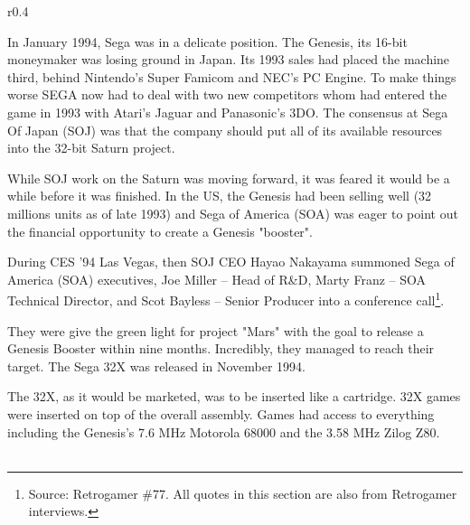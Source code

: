 \begin{wrapfigure}[4]{r}{0.4\textwidth}{
\centering {}}
\end{wrapfigure}
In January 1994, Sega was in a delicate position. The Genesis, its 16-bit moneymaker was losing ground in Japan. Its 1993 sales had placed the machine third, behind Nintendo's Super Famicom and NEC's PC Engine. To make things worse SEGA now had to deal with two new competitors whom had entered the game in 1993 with Atari's Jaguar and Panasonic's 3DO. The consensus at Sega Of Japan (SOJ) was that the company should put all of its available resources into the 32-bit Saturn project.\\
\par
While SOJ work on the Saturn was moving forward, it was feared it would be a while before it was finished. In the US, the Genesis had been selling well (32 millions units as of late 1993) and Sega of America (SOA) was eager to point out the financial opportunity to create a Genesis "booster".\\
\par
During CES '94 Las Vegas, then SOJ CEO Hayao Nakayama summoned Sega of America (SOA) executives, Joe Miller -- Head of R\&D, Marty Franz -- SOA Technical Director, and Scot Bayless -- Senior Producer into a conference call\footnote{Source: Retrogamer \#77. All quotes in this section are also from Retrogamer interviews.}.\\
\par 
They were give the green light for project "Mars" with the goal to release a Genesis Booster within nine months. Incredibly, they managed to reach their target. The Sega 32X was released in November 1994.\\
\par
{}%
\par
The 32X, as it would be marketed, was to be inserted like a cartridge. 32X games were inserted on top of the overall assembly. Games had access to everything including the Genesis's 7.6 MHz Motorola 68000 and the 3.58 MHz Zilog Z80.\\

\\
\par

